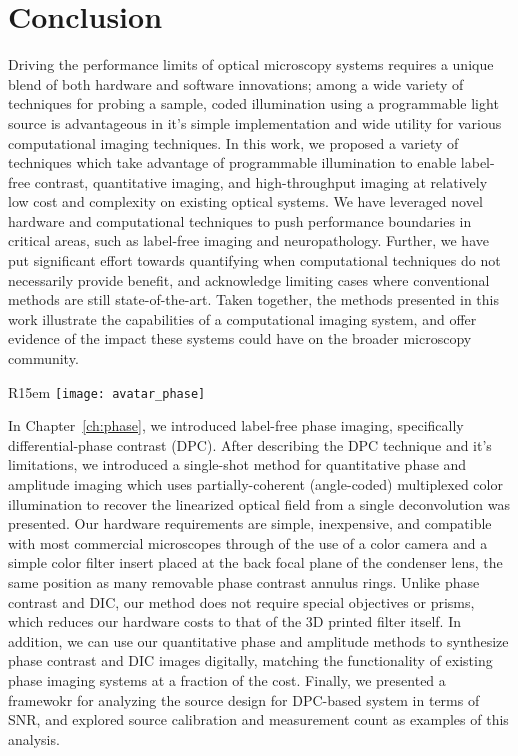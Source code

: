 \chapter{Conclusion}\label{ch:conclusion}
Driving the performance limits of optical microscopy systems requires a unique blend of both hardware and software innovations; among a wide variety of techniques for probing a sample, coded illumination using a programmable light source is advantageous in it's simple implementation and wide utility for various computational imaging techniques. In this work, we proposed a variety of techniques which take advantage of programmable illumination to enable label-free contrast, quantitative imaging, and high-throughput imaging at relatively low cost and complexity on existing optical systems. We have leveraged novel hardware and computational techniques to push performance boundaries in critical areas, such as label-free imaging and neuropathology. Further, we have put significant effort towards quantifying when computational techniques do not necessarily provide benefit, and acknowledge limiting cases where conventional methods are still state-of-the-art. Taken together, the methods presented in this work illustrate the capabilities of a computational imaging system, and offer evidence of the impact these systems could have on the broader microscopy community.

\begin{wrapfigure}{R}{15em}
  \texttt{[image: avatar\_phase]}
\end{wrapfigure}

In Chapter~\ref{ch:phase}, we introduced label-free phase imaging, specifically differential-phase contrast (DPC). After describing the DPC technique and it's limitations, we introduced a single-shot method for quantitative phase and amplitude imaging which uses partially-coherent (angle-coded) multiplexed color illumination to recover the linearized optical field from a single deconvolution was presented. Our hardware requirements are simple, inexpensive, and compatible with most commercial microscopes through of the use of a color camera and a simple color filter insert placed at the back focal plane of the condenser lens, the same position as many removable phase contrast annulus rings. Unlike phase contrast and DIC, our method does not require special objectives or prisms, which reduces our hardware costs to that of the 3D printed filter itself. In addition, we can use our quantitative phase and amplitude methods to synthesize phase contrast and DIC images digitally, matching the functionality of existing phase imaging systems at a fraction of the cost. Finally, we presented a framewokr for analyzing the source design for DPC-based system in terms of SNR, and explored source calibration and measurement count as examples of this analysis.

